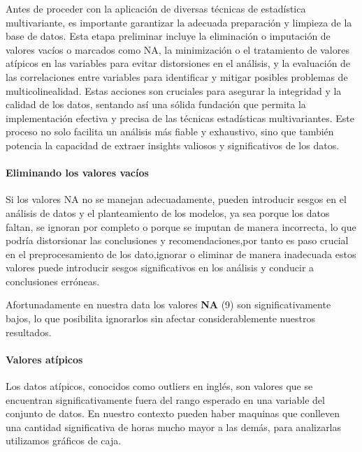 \documentclass[
  11pt,
  bookmarksnumbered]{article}
\begin{document}
Antes de proceder con la aplicación de diversas técnicas de estadística multivariante, es importante garantizar la adecuada preparación y limpieza de la base de datos.
Esta etapa preliminar incluye la eliminación o imputación de valores vacíos o marcados como NA, la minimización o el tratamiento de valores atípicos en las variables para evitar distorsiones en el análisis, y la evaluación de las correlaciones entre variables para identificar y mitigar posibles problemas de multicolinealidad.
Estas acciones son cruciales para asegurar la integridad y la calidad de los datos, sentando así una sólida fundación que permita la implementación efectiva y precisa de las técnicas estadísticas multivariantes.
Este proceso no solo facilita un análisis más fiable y exhaustivo, sino que también potencia la capacidad de extraer insights valiosos y significativos de los datos.

\hypertarget{eliminando-los-valores-vacuxedos}{%
\paragraph{Eliminando los valores vacíos}\label{eliminando-los-valores-vacuxedos}}

Si los valores NA no se manejan adecuadamente, pueden introducir sesgos en el análisis de datos y el planteamiento de los modelos, ya sea porque los datos faltan, se ignoran por completo o porque se imputan de manera incorrecta, lo que podría distorsionar las conclusiones y recomendaciones,por tanto es paso crucial en el preprocesamiento de los dato,ignorar o eliminar de manera inadecuada estos valores puede introducir sesgos significativos en los análisis y conducir a conclusiones erróneas.

Afortunadamente en nuestra data los valores \textbf{NA} (9) son significativamente bajos, lo que posibilita ignorarlos sin afectar considerablemente nuestros resultados.

\hypertarget{valores-atuxedpicos}{%
\paragraph{Valores atípicos}\label{valores-atuxedpicos}}

Los datos atípicos, conocidos como outliers en inglés, son valores que se encuentran significativamente fuera del rango esperado en una variable del conjunto de datos.
En nuestro contexto pueden haber maquinas que conlleven una cantidad significativa de horas mucho mayor a las demás, para analizarlas utilizamos gráficos de caja.
\end{document}
